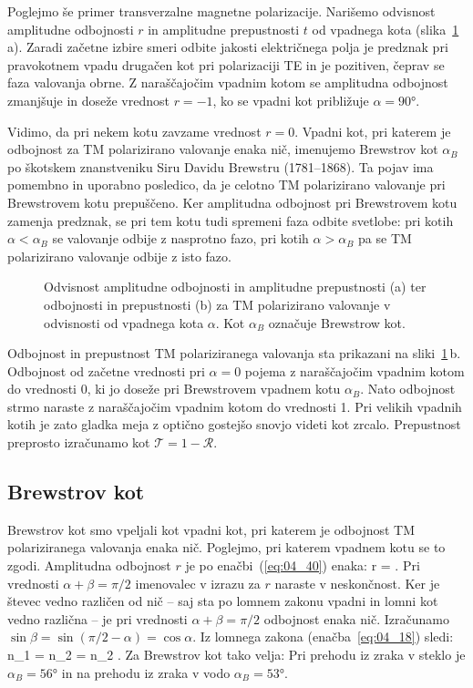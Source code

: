 Poglejmo še primer transverzalne magnetne polarizacije. Narišemo odvisnost
amplitudne odbojnosti $r$ in amplitudne prepustnosti $t$ od vpadnega kota 
(slika~\ref{fig:04_redtm}\,a). Zaradi začetne izbire smeri odbite jakosti
električnega polja je predznak pri pravokotnem vpadu drugačen kot pri 
polarizaciji TE in je pozitiven, čeprav se faza valovanja obrne. 
Z naraščajočim vpadnim kotom se amplitudna
odbojnost zmanjšuje in doseže vrednost $r=-1$, ko se vpadni kot
približuje $\alpha = 90\si{\degree}$. 

Vidimo, da pri nekem kotu zavzame  
vrednost $r = 0$. Vpadni kot, pri katerem je odbojnost za TM polarizirano
valovanje enaka nič, imenujemo Brewstrov kot $\alpha_B$ po škotskem 
znanstveniku Siru Davidu Brewstru (1781--1868). Ta pojav ima pomembno in uporabno
posledico, da je celotno TM polarizirano valovanje pri Brewstrovem kotu prepuščeno. 
Ker amplitudna odbojnost pri Brewstrovem kotu zamenja predznak, se pri tem
kotu tudi spremeni faza odbite svetlobe: pri kotih $\alpha < \alpha_B$ se valovanje
odbije z nasprotno fazo, pri kotih $\alpha > \alpha_B$ pa se TM polarizirano
valovanje odbije z isto fazo.
\begin{figure}[ht]
\centering
\def\svgwidth{140truemm} 

\caption{Odvisnost amplitudne odbojnosti in amplitudne prepustnosti (a) ter odbojnosti in 
prepustnosti (b) za TM polarizirano valovanje v odvisnosti od vpadnega kota $\alpha$. Kot
$\alpha_B$ označuje Brewstrow kot.}
\label{fig:04_redtm}
\end{figure}

Odbojnost in prepustnost TM polariziranega valovanja sta prikazani na 
sliki~\ref{fig:04_redtm}\,b. Odbojnost od začetne vrednosti pri $\alpha=0$
pojema z naraščajočim vpadnim kotom do vrednosti 0, ki jo doseže pri 
Brewstrovem vpadnem kotu $\alpha_B$. Nato odbojnost strmo naraste z naraščajočim vpadnim
kotom do vrednosti 1. Pri velikih vpadnih kotih je zato
gladka meja z optično gostejšo snovjo videti kot zrcalo. Prepustnost preprosto izračunamo 
kot $\mathcal{T} = 1- \mathcal{R}$.

\subsection*{Brewstrov kot}
Brewstrov kot smo vpeljali kot vpadni kot, pri katerem je odbojnost
TM polariziranega valovanja enaka nič. Poglejmo, pri katerem
vpadnem kotu se to zgodi. Amplitudna odbojnost $r$ je po enačbi~(\ref{eq:04_40})
enaka:
\beq
r = \frac{\tan(\alpha-\beta)}{\tan(\alpha+\beta)}.
\label{eq:04_50}
\eeq
Pri vrednosti $\alpha + \beta = \pi/2$ imenovalec v izrazu za $r$ 
naraste v neskončnost. Ker je števec vedno različen od nič -- saj
sta po lomnem zakonu vpadni in lomni kot vedno različna -- je pri 
vrednosti $\alpha + \beta = \pi/2$ odbojnost enaka nič.
Izračunamo $\sin \beta = \sin (\pi/2-\alpha) = \cos \alpha$. 
Iz lomnega zakona (enačba~\ref{eq:04_18}) sledi:
\beq
n_1 \sin \alpha= n_2 \sin \beta= n_2 \cos \alpha.
\label{eq:04_51}
\eeq
Za Brewstrov kot tako velja:
Pri prehodu iz zraka v steklo je $\alpha_B = 56\si{\degree}$ in na prehodu
iz zraka v vodo $\alpha_B = 53\si{\degree}$. 

